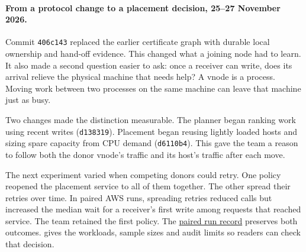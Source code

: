 \documentclass[11pt]{article}
\begin{document}
\paragraph{From a protocol change to a placement decision, 25--27 November 2026.}
Commit \texttt{406c143} replaced the earlier certificate graph with durable local ownership and hand-off evidence. This changed what a joining node had to learn. It also made a second question easier to ask: once a receiver can write, does its arrival relieve the physical machine that needs help? A vnode is a process. Moving work between two processes on the same machine can leave that machine just as busy.

Two changes made the distinction measurable. The planner began ranking work using recent writes (\texttt{d138319}). Placement began reusing lightly loaded hosts and sizing spare capacity from CPU demand (\texttt{d6110b4}). This gave the team a reason to follow both the donor vnode's traffic and its host's traffic after each move.

The next experiment varied when competing donors could retry. One policy reopened the placement service to all of them together. The other spread their retries over time. In paired AWS runs, spreading retries reduced calls but increased the median wait for a receiver's first write among requests that reached service. The team retained the first policy. The \href{https://github.com/indexus/core/blob/e4b9072/docs/benchmarks/aws-placement-100-20261127/granular50/aws-pair.md}{paired run record} preserves both outcomes.  gives the workloads, sample sizes and audit limits so readers can check that decision.
\end{document}
